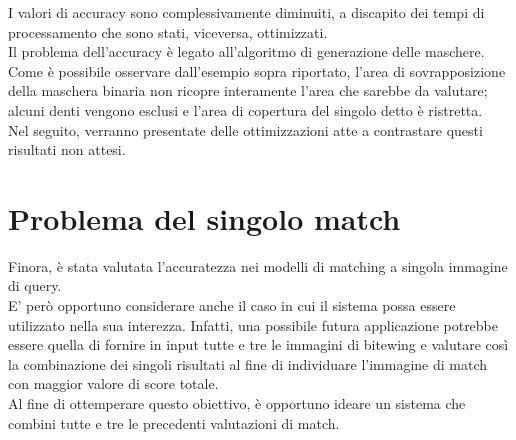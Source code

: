 \documentclass[12pt,a4paper,openright,twoside]{book}
\begin{document}
I valori di accuracy sono complessivamente diminuiti, a discapito dei tempi di processamento che sono stati, viceversa, ottimizzati.\\
Il problema dell'accuracy è legato all'algoritmo di generazione delle maschere. Come è possibile osservare dall'esempio sopra riportato, l'area di sovrapposizione della maschera binaria non ricopre interamente l'area che sarebbe da valutare; alcuni denti vengono esclusi e l'area di copertura del singolo detto è ristretta.\\
Nel seguito, verranno presentate delle ottimizzazioni atte a contrastare questi risultati non attesi.

\section{Problema del singolo match}
Finora, è stata valutata l'accuratezza nei modelli di matching a singola immagine di query. \\
E' però opportuno considerare anche il caso in cui il sistema possa essere utilizzato nella sua interezza. Infatti, una possibile futura applicazione potrebbe essere quella di fornire in input tutte e tre le immagini di bitewing e valutare così la combinazione dei singoli risultati al fine di individuare l'immagine di match con maggior valore di score totale.\\
Al fine di ottemperare questo obiettivo, è opportuno ideare un sistema che combini tutte e tre le precedenti valutazioni di match.

\end{document}
